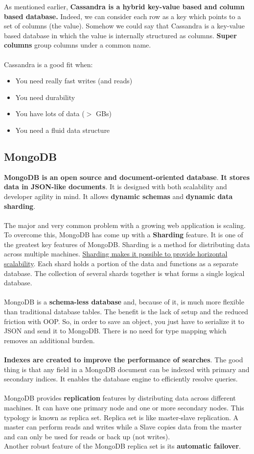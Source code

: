 \documentclass[10pt,a4paper]{article}
\newcommand{\nline}{\\~\\}
\begin{document}
As mentioned earlier, \textbf{Cassandra is a hybrid key-value based and column based database.} Indeed, we can consider each row as a key which points to a set of columns (the value). Somehow we could say that Cassandra is a key-value based database in which the value is internally structured as columns.
\textbf{Super columns} group columns under a common name.
\nline
Cassandra is a good fit when:
\begin{itemize}
	\item You need really fast writes (and reads)
	\item You need durability
	\item You have lots of data ($>$ GBs)
	\item You need a fluid data structure
\end{itemize}

\subsection{MongoDB}
\textbf{MongoDB is an open source and document-oriented database}. \textbf{It stores data in JSON-like documents}. It is designed with both scalability and developer agility in mind. It allows \textbf{dynamic schemas} and \textbf{dynamic data sharding}.
\nline
The major and very common problem with a growing web application is scaling. To overcome this, MongoDB has come up with a \textbf{Sharding} feature. It is one of the greatest key features of MongoDB. Sharding is a method for distributing data across multiple machines.
\uline{Sharding makes it possible to provide horizontal scalability}. Each shard holds a portion of the data and functions as a separate database. The collection of several shards together is what forms a single logical database.
\nline
MongoDB is a \textbf{schema-less database} and, because of it, is much more flexible than traditional database tables. The benefit is the lack of setup and the reduced friction with OOP. So, in order to save an object, you just have to serialize it to JSON and send it to MongoDB. There is no need for type mapping which removes an additional burden.
\nline
\textbf{Indexes are created to improve the performance of searches}. The good thing is that any field in a MongoDB document can be indexed with primary and secondary indices. It enables the database engine to efficiently resolve queries.
\nline
MongoDB provides \textbf{replication} features by distributing data across different machines. It can have one primary node and one or more secondary nodes. This typology is known as replica set. Replica set is like master-slave replication. A master can perform reads and writes while a Slave copies data from the master and can only be used for reads or back up (not writes). \\ Another robust feature of the MongoDB replica set is its \textbf{automatic failover}.
\end{document}
